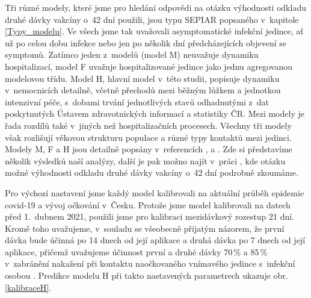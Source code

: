 Tři různé modely, které jsme pro hledání odpovědi na otázku výhodnosti odkladu druhé dávky vakcíny o~42 dní použili, jsou typu SEPIAR popsaného v~kapitole \ref{Typy_modelu}. Ve všech jsme tak uvažovali asymptomatické infekční jedince, ať už po celou dobu infekce nebo jen po několik dní předcházejících objevení se symptomů. Zatímco jeden z~modelů (model M) neuvažuje dynamiku hospitalizací, model F uvažuje hospitalizované jedince jako jednu agregovanou modelovou třídu. Model H, hlavní model v~této studii, popisuje dynamiku v~nemocnicích detailně, včetně přechodů mezi běžným lůžkem a jednotkou intenzivní péče, s~dobami trvání jednotlivých stavů odhadnutými z~dat poskytnutých Ústavem zdravotnických informací a statistiky ČR. Mezi modely je řada rozdílů také v~jiných než hospitalizačních procesech. Všechny tři modely však rozlišují věkovou strukturu populace a různé typy kontaktů mezi jedinci. Modely M, F a H jsou detailně popsány v~referencích \cite{M-techrep2021}, \cite{Smid2021seir} a \cite{vaccpaper}. Zde si představíme několik výsledků naší analýzy, další je pak možno najít v~práci \cite{vaccpaper}, kde otázku možné výhodnosti odkladu druhé dávky vakcíny o~42 dní podrobně zkoumáme. 

Pro výchozí nastavení jsme každý model kalibrovali na aktuální průběh epidemie covid-19 a vývoj očkování v~Česku. Protože jsme model kalibrovali na datech před 1.\ dubnem 2021, použili jsme pro kalibraci mezidávkový rozestup 21 dní. Kromě toho uvažujeme, v~souladu se všeobecně přijatým názorem, že první dávka bude účinná po 14 dnech od její aplikace a druhá dávka po 7 dnech od její aplikace, přičemž uvažujeme účinnost první a druhé dávky 70\,\% a 85\,\% v~zabránění nakažení při kontaktu naočkovaného vnímavého jedince s~infekční osobou \cite{Hall_etal2021}. Predikce modelu H při takto nastavených parametrech ukazuje obr.\,\ref{kalibraceH}. 

